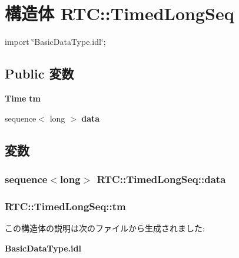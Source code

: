 \section{構造体 RTC::TimedLongSeq}
\label{structRTC_1_1TimedLongSeq}


{\ttfamily import \char`\"{}BasicDataType.idl\char`\"{};}

\subsection*{Public 変数}
\begin{DoxyCompactItemize}
\item 
{\bf Time} {\bf tm}
\item 
sequence$<$ long $>$ {\bf data}
\end{DoxyCompactItemize}


\subsection{変数}
\subsubsection[{data}]{\setlength{\rightskip}{0pt plus 5cm}sequence$<$long$>$ {\bf RTC::TimedLongSeq::data}}\label{structRTC_1_1TimedLongSeq_a7cb12c9383805cd91d11667feec996a6}
\subsubsection[{tm}]{ {\bf RTC::TimedLongSeq::tm}}\label{structRTC_1_1TimedLongSeq_ad3b53881eff39c36d3d7718190bf3485}


この構造体の説明は次のファイルから生成されました:\begin{DoxyCompactItemize}
\item 
{\bf BasicDataType.idl}\end{DoxyCompactItemize}
